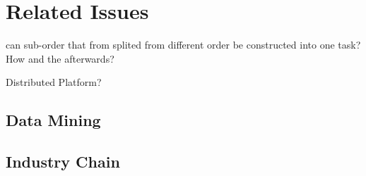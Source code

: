 \section{Related Issues} %
\label{sec:problem}

can sub-order that from splited from different order be constructed into one task? How and the afterwards?

Distributed Platform?

\subsection{Data Mining} %
\label{sub:data_mining}


\subsection{Industry Chain} %
\label{sub:industry_chain}

